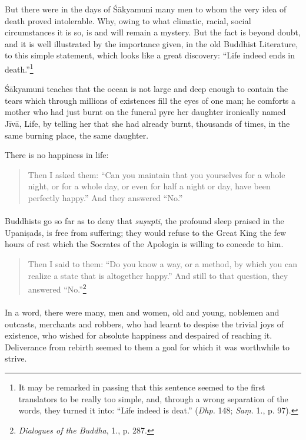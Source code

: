 \documentclass[a4paper, 11pt, oneside, english]{article}
\begin{document}
But there were in the days of Śākyamuni many men to whom the very idea of death proved intolerable. Why, owing to what climatic, racial, social circumstances it is so, is and will remain a mystery. But the fact is beyond doubt, and it is well illustrated by the importance given, in the old Buddhist Literature, to this simple statement, which looks like a great discovery: ``Life indeed ends in death.''\footnote{It may be remarked in passing that this sentence seemed to the first translators to be really too simple, and, through a wrong separation of the words, they turned it into: ``Life indeed is deat.'' (\emph{Dhp.} 148; \emph{Saṃ.} 1., p. 97).}

Śākyamuni teaches that the ocean is not large and deep enough to contain the tears which through millions of existences fill the eyes of one man; he comforts a mother who had just burnt on the funeral pyre her daughter ironically named Jīvā, Life, by telling her that she had already burnt, thousands of times, in the same burning place, the same daughter.

There is no happiness in life:
\begin{quotation}
\small
Then I asked them: ``Can you maintain that you yourselves for a whole night, or for a whole day, or even for half a night or day, have been perfectly happy.'' And they answered ``No.''
\end{quotation}
\paragraph{}
Buddhists go so far as to deny that \emph{suṣupti}, the profound sleep praised in the Upaniṣads, is free from suffering; they would refuse to the Great King the few hours of rest which the Socrates of the Apologia is willing to concede to him.
\begin{quotation}
\small
Then I said to them: ``Do you know a way, or a method, by which you can realize a state that is altogether happy.'' And still to that question, they answered ``No.''\footnote{\emph{Dialogues of the Buddha}, 1., p. 287.}
\end{quotation}
\paragraph{}
In a word, there were many, men and women, old and young, noblemen and outcasts, merchants and robbers, who had learnt to despise the trivial joys of existence, who wished for absolute happiness and despaired of reaching it. Deliverance from rebirth seemed to them a goal for which it was worthwhile to strive.
\end{document}

